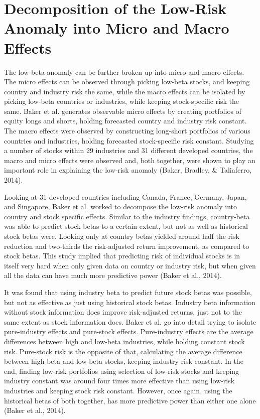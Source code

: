 \documentclass[12pt,twoside]{reedthesis}
\theoremstyle{definition}
\theoremstyle{definition}
\theoremstyle{definition}
\theoremstyle{remark}
\begin{document}
\section{Decomposition of the Low-Risk Anomaly into Micro and Macro
Effects}\label{decomposition-of-the-low-risk-anomaly-into-micro-and-macro-effects}

The low-beta anomaly can be further broken up into micro and macro
effects. The micro effects can be observed through picking low-beta
stocks, and keeping country and industry risk the same, while the macro
effects can be isolated by picking low-beta countries or industries,
while keeping stock-specific risk the same. Baker et al. generates
observable micro effects by creating portfolios of equity longs and
shorts, holding forecasted country and industry risk constant. The macro
effects were observed by constructing long-short portfolios of various
countries and industries, holding forecasted stock-specific risk
constant. Studying a number of stocks within 29 industries and 31
different developed countries, the macro and micro effects were observed
and, both together, were shown to play an important role in explaining
the low-risk anomaly (Baker, Bradley, \& Taliaferro, 2014).

Looking at 31 developed countries including Canada, France, Germany,
Japan, and Singapore, Baker et al. worked to decompose the low-risk
anomaly into country and stock specific effects. Similar to the industry
findings, country-beta was able to predict stock betas to a certain
extent, but not as well as historical stock betas were. Looking only at
country betas yielded around half the risk reduction and two-thirds the
risk-adjusted return improvement, as compared to stock betas. This study
implied that predicting risk of individual stocks is in itself very hard
when only given data on country or industry risk, but when given all the
data can have much more predictive power (Baker et al., 2014).

It was found that using industry beta to predict future stock betas was
possible, but not as effective as just using historical stock betas.
Industry beta information without stock information does improve
risk-adjusted returns, just not to the same extent as stock information
does. Baker et al. go into detail trying to isolate pure-industry
effects and pure-stock effects. Pure-industry effects are the average
differences between high and low-beta industries, while holding constant
stock risk. Pure-stock risk is the opposite of that, calculating the
average difference between high-beta and low-beta stocks, keeping
industry risk constant. In the end, finding low-risk portfolios using
selection of low-risk stocks and keeping industry constant was around
four times more effective than using low-risk industries and keeping
stock risk constant. However, once again, using the historical betas of
both together, has more predictive power than either one alone (Baker et
al., 2014).
\end{document}
